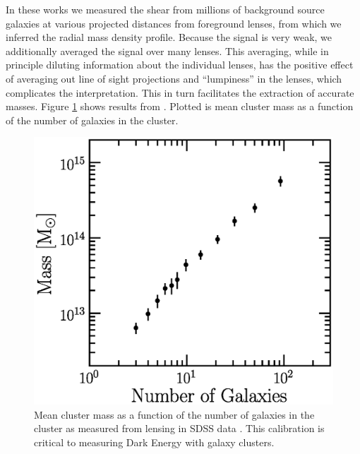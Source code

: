 \documentclass[12pt]{article}
\begin{document}
In these works we measured the shear from millions of background source
galaxies at various projected distances from foreground lenses, from which we
inferred the radial mass density profile.  Because the signal is very weak, we
additionally averaged the signal over many lenses.  This averaging, while in
principle diluting information about the individual lenses, has the positive
effect of averaging out line of sight projections and ``lumpiness'' in the
lenses, which complicates the interpretation.  This in turn facilitates the
extraction of accurate masses.  Figure \ref{fig:massngals} shows results
from \cite{SheldonLensing07,JohnstonLensing07}. Plotted is mean cluster mass as
a function of the number of galaxies in the cluster.  

\begin{figure}[p]
\centering
\includegraphics[scale=0.7]{mass-rich-plot.eps}
\caption{Mean cluster mass as a function of the number of
galaxies in the cluster as measured from lensing in SDSS
data \cite{SheldonLensing07,JohnstonLensing07}. This calibration
is critical to measuring Dark Energy with galaxy clusters.\label{fig:massngals}}
\end{figure}
\end{document}
